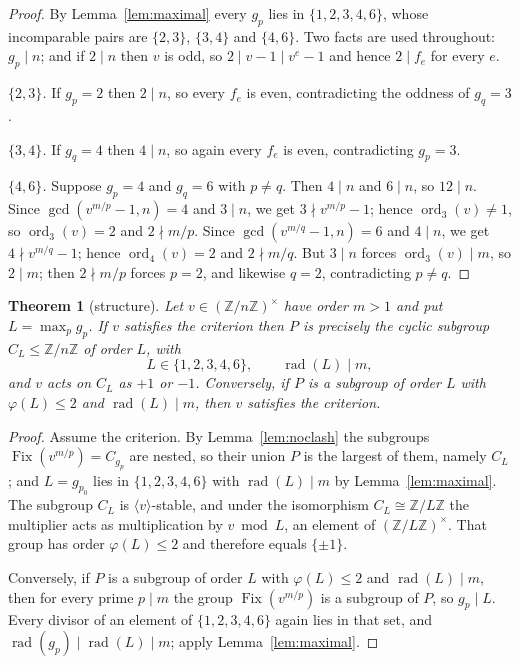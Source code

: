 \documentclass[11pt,a4paper]{article}
\theoremstyle{plain}
\newtheorem{theorem}{Theorem}[section]
\theoremstyle{definition}
\theoremstyle{remark}
\newcommand{\Z}{\mathbb{Z}}
\newcommand{\Zn}{\Z/n\Z}
\newcommand{\units}[1]{(\Z/#1\Z)^{\times}}
\newcommand{\Fix}{\operatorname{Fix}}
\newcommand{\rad}{\operatorname{rad}}
\newcommand{\ord}{\operatorname{ord}}
\begin{document}
\begin{proof}
By Lemma~\ref{lem:maximal} every $g_p$ lies in $\{1,2,3,4,6\}$, whose incomparable pairs are
$\{2,3\}$, $\{3,4\}$ and $\{4,6\}$. Two facts are used throughout: $g_p\mid n$; and if
$2\mid n$ then $v$ is odd, so $2\mid v-1\mid v^{e}-1$ and hence $2\mid f_e$ for every $e$.

\emph{$\{2,3\}$.} If $g_p=2$ then $2\mid n$, so every $f_e$ is even, contradicting the
oddness of $g_q=3$.

\emph{$\{3,4\}$.} If $g_q=4$ then $4\mid n$, so again every $f_e$ is even, contradicting
$g_p=3$.

\emph{$\{4,6\}$.} Suppose $g_p=4$ and $g_q=6$ with $p\ne q$. Then $4\mid n$ and $6\mid n$, so
$12\mid n$. Since $\gcd(v^{m/p}-1,n)=4$ and $3\mid n$, we get $3\nmid v^{m/p}-1$; hence
$\ord_3(v)\ne1$, so $\ord_3(v)=2$ and $2\nmid m/p$. Since $\gcd(v^{m/q}-1,n)=6$ and
$4\mid n$, we get $4\nmid v^{m/q}-1$; hence $\ord_4(v)=2$ and $2\nmid m/q$. But $3\mid n$
forces $\ord_3(v)\mid m$, so $2\mid m$; then $2\nmid m/p$ forces $p=2$, and likewise $q=2$,
contradicting $p\ne q$.
\end{proof}

\begin{theorem}[structure]\label{thm:structure}
Let $v\in\units{n}$ have order $m>1$ and put $L=\max_p g_p$. If $v$ satisfies the criterion
then $P$ is precisely the cyclic subgroup $C_L\le\Zn$ of order $L$, with
\[
  L\in\{1,2,3,4,6\},\qquad \rad(L)\mid m,
\]
and $v$ acts on $C_L$ as $+1$ or $-1$. Conversely, if $P$ is a subgroup of order $L$ with
$\varphi(L)\le2$ and $\rad(L)\mid m$, then $v$ satisfies the criterion.
\end{theorem}

\begin{proof}
Assume the criterion. By Lemma~\ref{lem:noclash} the subgroups $\Fix(v^{m/p})=C_{g_p}$ are
nested, so their union $P$ is the largest of them, namely $C_L$; and $L=g_{p_0}$ lies in
$\{1,2,3,4,6\}$ with $\rad(L)\mid m$ by Lemma~\ref{lem:maximal}. The subgroup $C_L$ is
$\langle v\rangle$-stable, and under the isomorphism $C_L\cong\Z/L\Z$ the multiplier acts as
multiplication by $v\bmod L$, an element of $\units{L}$. That group has order
$\varphi(L)\le2$ and therefore equals $\{\pm1\}$.

Conversely, if $P$ is a subgroup of order $L$ with $\varphi(L)\le2$ and $\rad(L)\mid m$, then
for every prime $p\mid m$ the group $\Fix(v^{m/p})$ is a subgroup of $P$, so $g_p\mid L$.
Every divisor of an element of $\{1,2,3,4,6\}$ again lies in that set, and
$\rad(g_p)\mid\rad(L)\mid m$; apply Lemma~\ref{lem:maximal}.
\end{proof}
\end{document}
